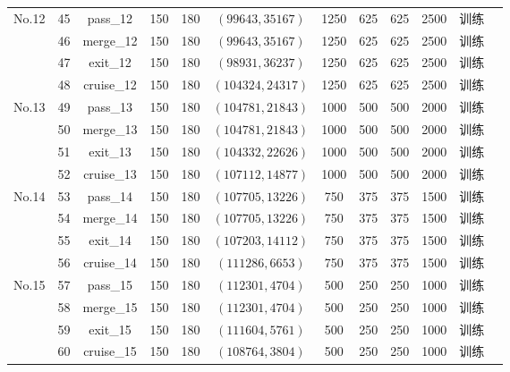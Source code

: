 {\begin{longtable}{X c c c c c c c c c c l}
  \multirow{4}{*}{No.12} 
  & 45 & pass\_12 & 150 & 180 & $(99643,35167)$ & 1250 & 625 & 625 & 2500 & 训练 \\
  & 46 & merge\_12 & 150 & 180 & $(99643,35167)$ & 1250 & 625 & 625 & 2500 & 训练 \\
  & 47 & exit\_12 & 150 & 180 & $(98931,36237)$ & 1250 & 625 & 625 & 2500 & 训练 \\
  & 48 & cruise\_12 & 150 & 180 & $(104324,24317)$ & 1250 & 625 & 625 & 2500 & 训练 \\
  \midrule

  \multirow{4}{*}{No.13} 
  & 49 & pass\_13 & 150 & 180 & $(104781,21843)$ & 1000 & 500 & 500 & 2000 & 训练 \\
  & 50 & merge\_13 & 150 & 180 & $(104781,21843)$ & 1000 & 500 & 500 & 2000 & 训练 \\
  & 51 & exit\_13 & 150 & 180 & $(104332,22626)$ & 1000 & 500 & 500 & 2000 & 训练 \\
  & 52 & cruise\_13 & 150 & 180 & $(107112,14877)$ & 1000 & 500 & 500 & 2000 & 训练 \\
  \midrule

  \multirow{4}{*}{No.14} 
  & 53 & pass\_14 & 150 & 180 & $(107705,13226)$ & 750 & 375 & 375 & 1500 & 训练 \\
  & 54 & merge\_14 & 150 & 180 & $(107705,13226)$ & 750 & 375 & 375 & 1500 & 训练 \\
  & 55 & exit\_14 & 150 & 180 & $(107203,14112)$ & 750 & 375 & 375 & 1500 & 训练 \\
  & 56 & cruise\_14 & 150 & 180 & $(111286,6653)$ & 750 & 375 & 375 & 1500 & 训练 \\
  \midrule

  \multirow{4}{*}{No.15} 
  & 57 & pass\_15 & 150 & 180 & $(112301,4704)$ & 500 & 250 & 250 & 1000 & 训练 \\
  & 58 & merge\_15 & 150 & 180 & $(112301,4704)$ & 500 & 250 & 250 & 1000 & 训练 \\
  & 59 & exit\_15 & 150 & 180 & $(111604,5761)$ & 500 & 250 & 250 & 1000 & 训练 \\
  & 60 & cruise\_15 & 150 & 180 & $(108764,3804)$ & 500 & 250 & 250 & 1000 & 训练 \\

  \end{longtable}
  }%




